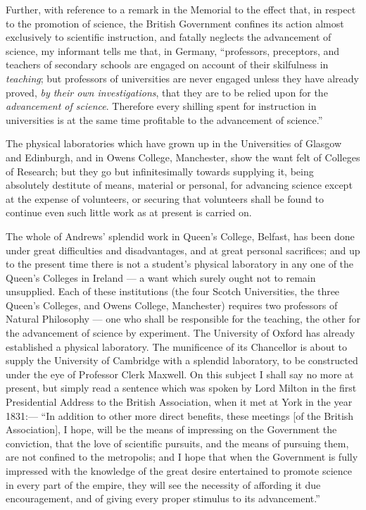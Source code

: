 \documentclass[a4paper, 11pt, oneside, english]{article}
\begin{document}
Further, with reference to a remark in the Memorial to the effect that, in respect to the promotion of science, the British Government confines its action almost exclusively to scientific instruction, and fatally neglects the advancement of science, my informant tells me that, in Germany, ``professors, preceptors, and teachers of secondary schools are engaged on account of their skilfulness in \emph{teaching}; but professors of universities are never engaged unless they have already proved, \emph{by their own investigations}, that they are to be relied upon for the \emph{advancement of science}. Therefore every shilling spent for instruction in universities is at the same time profitable to the advancement of science.''

The physical laboratories which have grown up in the Universities of Glasgow and Edinburgh, and in Owens College, Manchester, show the want felt of Colleges of Research; but they go but infinitesimally towards supplying it, being absolutely destitute of means, material or personal, for advancing science except at the expense of volunteers, or securing that volunteers shall be found to continue even such little work as at present is carried on.

The whole of Andrews' splendid work in Queen's College, Belfast, has been done under great difficulties and disadvantages, and at great personal sacrifices; and up to the present time there is not a student's physical laboratory in any one of the Queen's Colleges in Ireland --- a want which surely ought not to remain unsupplied. Each of these institutions (the four Scotch Universities, the three Queen's Colleges, and Owens College, Manchester) requires two professors of Natural Philosophy --- one who shall be responsible for the teaching, the other for the advancement of science by experiment. The University of Oxford has already established a physical laboratory. The munificence of its Chancellor is about to supply the University of Cambridge with a splendid laboratory, to be constructed under the eye of Professor Clerk Maxwell. On this subject I shall say no more at present, but simply read a sentence which was spoken by Lord Milton in the first Presidential Address to the British Association, when it met at York in the year 1831:--- ``In addition to other more direct benefits, these meetings [of the British Association], I hope, will be the means of impressing on the Government the conviction, that the love of scientific pursuits, and the means of pursuing them, are not confined to the metropolis; and I hope that when the Government is fully impressed with the knowledge of the great desire entertained to promote science in every part of the empire, they will see the necessity of affording it due encouragement, and of giving every proper stimulus to its advancement.''
\end{document}
